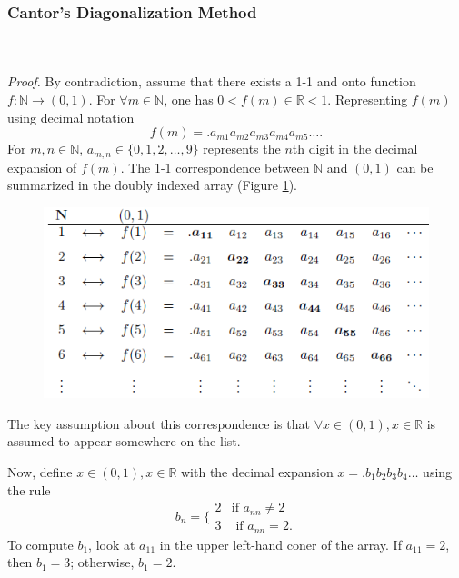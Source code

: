 \documentclass{article}
\begin{document}
        \subsubsection{Cantor's Diagonalization Method}
            \\ \\
            \textit{Proof.} By contradiction, assume that there exists a 1-1 and onto function $f: \mathbb{N} \to (0,1)$. For $\forall m \in \mathbb{N}$, one has $0 < f(m) \in \mathbb{R} < 1$. Representing $f(m)$ using decimal notation
            \begin{equation*}
                f(m) = .a_{m1}a_{m2}a_{m3}a_{m4}a_{m5}\dots.
            \end{equation*}
            For $m,n \in \mathbb{N}$, $a_{m,n} \in \{0,1,2,\dots,9\}$ represents the $n$th digit in the decimal expansion of $f(m)$. The 1-1 correspondence between $\mathbb{N}$ and $(0,1)$ can be summarized in the doubly indexed array (Figure \ref{theorem1.6.1}).
            \begin{figure}[ht!]
                \centering
                \includegraphics[width=0.8\linewidth]{figs/theorem1.6.1.png}
                \caption{}
                \label{theorem1.6.1}
            \end{figure}
            The key assumption about this correspondence is that $\forall x \in (0,1), x \in \mathbb{R}$ is assumed to appear somewhere on the list.
            
            Now, define $x \in (0,1), x \in \mathbb{R}$ with the decimal expansion $x=.b_1 b_2 b_3 b_4 \dots$ using the rule
            \begin{equation*}
                b_n = \bigg\{ \begin{matrix} 2 & \text{if } a_{nn} \neq 2 \\ 3 & \text{ if } a_{nn} = 2. \end{matrix}
            \end{equation*}
            To compute $b_1$, look at $a_{11}$ in the upper left-hand coner of the array. If $a_{11}=2$, then $b_1=3$; otherwise, $b_1=2$.
            
\end{document}
